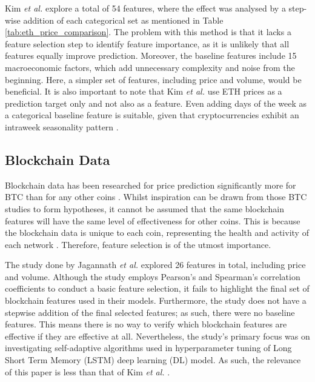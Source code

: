 \documentclass[ %
                    author={Raj Dhakan},
                supervisor={Dr. Ayush Joshi},
                    degree={MSc},
                     title={Ethereum Price Prediction using Internal and External Factors},
                  subtitle={},
                      type={},
                      year={2025}]{dissertation}
\begin{document}
Kim \textit{et al.} \cite{RN141} explore a total of 54 features, where the effect was analysed by a step-wise addition of each categorical set as mentioned in Table \ref{tab:eth_price_comparison}. The problem with this method is that it lacks a feature selection step to identify feature importance, as it is unlikely that all features equally improve prediction. Moreover, the baseline features include 15 macroeconomic factors, which add unnecessary complexity and noise from the beginning. Here, a simpler set of features, including price and volume, would be beneficial. It is also important to note that Kim \textit{et al.} \cite{RN141} use ETH prices as a prediction target only and not also as a feature. Even adding days of the week as a categorical baseline feature is suitable, given that cryptocurrencies exhibit an intraweek seasonality pattern \cite{jasiak2024intraday}.

\subsection{Blockchain Data}
Blockchain data has been researched for price prediction significantly more for BTC than for any other coins \cite{john2024cryptocurrency,palaiokrassas2023machine}. Whilst inspiration can be drawn from those BTC studies to form hypotheses, it cannot be assumed that the same blockchain features will have the same level of effectiveness for other coins. This is because the blockchain data is unique to each coin, representing the health and activity of each network \cite{john2024cryptocurrency}. Therefore, feature selection is of the utmost importance.

The study done by Jagannath \textit{et al.} \cite{jagannath2021chain} explored 26 features in total, including price and volume. Although the study employs Pearson's and Spearman's correlation coefficients to conduct a basic feature selection, it fails to highlight the final set of blockchain features used in their models. Furthermore, the study does not have a stepwise addition of the final selected features; as such, there were no baseline features. This means there is no way to verify which blockchain features are effective if they are effective at all. Nevertheless, the study's primary focus was on investigating self-adaptive algorithms used in hyperparameter tuning of Long Short Term Memory (LSTM) deep learning (DL) model. As such, the relevance of this paper is less than that of Kim \textit{et al.} \cite{RN141}. 
\end{document}
